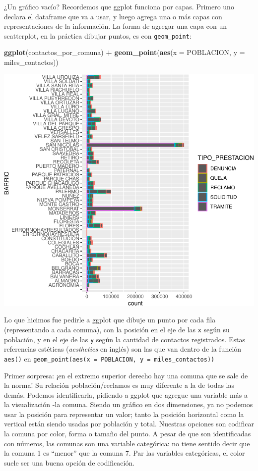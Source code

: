 \documentclass[]{book}
\newenvironment{Shaded}{\begin{snugshade}}{\end{snugshade}}
\newcommand{\KeywordTok}[1]{\textcolor[rgb]{0.13,0.29,0.53}{\textbf{#1}}}
\newcommand{\DataTypeTok}[1]{\textcolor[rgb]{0.13,0.29,0.53}{#1}}
\newcommand{\StringTok}[1]{\textcolor[rgb]{0.31,0.60,0.02}{#1}}
\newcommand{\OperatorTok}[1]{\textcolor[rgb]{0.81,0.36,0.00}{\textbf{#1}}}
\newcommand{\NormalTok}[1]{#1}
\begin{document}
¿Un gráfico vacío? Recordemos que ggplot funciona por capas. Primero uno
declara el dataframe que va a usar, y luego agrega una o más capas con
representaciones de la información. La forma de agregar una capa con un
scatterplot, en la práctica dibujar puntos, es con \texttt{geom\_point}:

\begin{Shaded}
\begin{Highlighting}[]
\KeywordTok{ggplot}\NormalTok{(contactos_por_comuna) }\OperatorTok{+}\StringTok{ }\KeywordTok{geom_point}\NormalTok{(}\KeywordTok{aes}\NormalTok{(}\DataTypeTok{x =}\NormalTok{ POBLACION, }\DataTypeTok{y =}\NormalTok{ miles_contactos))}
\end{Highlighting}
\end{Shaded}

\includegraphics{ciencia_de_datos_politicas_publicas_files/figure-latex/unnamed-chunk-79-1.pdf}

Lo que hicimos fue pedirle a ggplot que dibuje un punto por cada fila
(representando a cada comuna), con la posición en el eje de las
\texttt{x} según su población, y en el eje de las \texttt{y} según la
cantidad de contactos registrados. Estas referencias estéticas
(\emph{aesthetics} en inglés) son las que van dentro de la función
\texttt{aes()} en
\texttt{geom\_point(aes(x\ =\ POBLACION,\ y\ =\ miles\_contactos))}

Primer sorpresa: ¡en el extremo superior derecho hay una comuna que se
sale de la norma! Su relación población/reclamos es muy diferente a la
de todas las demás. Podemos identificarla, pidiendo a ggplot que agregue
una variable más a la visualización -la comuna. Siendo un gráfico en dos
dimensiones, ya no podemos usar la posición para representar un valor;
tanto la posición horizontal como la vertical están siendo usadas por
población y total. Nuestras opciones son codificar la comuna por color,
forma o tamaño del punto. A pesar de que son identificadas con números,
las comunas son una variable categórica: no tiene sentido decir que la
comuna 1 es ``menor'' que la comuna 7. Par las variables categóricas, el
color suele ser una buena opción de codificación.
\end{document}
